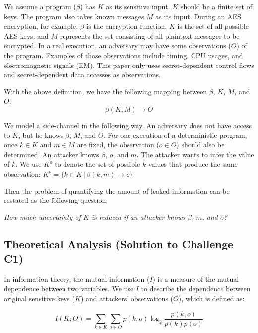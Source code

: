 We assume a program ($\beta$) has $K$ as its sensitive input. $K$ should be 
a finite set of keys. The program also takes known messages $M$ as its input. 
During an AES encryption, for example, 
$\beta$ is the encryption function. $K$ is the set of all possible AES keys, 
and $M$ represents the set consisting of all plaintext messages to be encrypted. In a real execution, an adversary may have 
some observations ($O$) of the program. Examples of those observations include 
timing, CPU usages, and electromagnetic signals (EM). This paper only
uses secret-dependent control flows and secret-dependent data 
accesses as observations.

With the above definition, we have the following mapping between $\beta$,
$K$, $M$, and $O$:
\begin{displaymath}
    \beta(K, M) \rightarrow O
\end{displaymath}


We model a side-channel in the following way. An adversary does not have
access to $K$, but he knows $\beta$, $M$, and $O$. For one execution of a
deterministic program, once $k \in K$ and $m \in M$ are fixed, the observation
($o \in O$) should also be determined. An attacker knows $\beta$, $o$,
and $m$. The attacker wants to infer the value of $k$. We use $K^o$ to denote
the set of possible $k$ values that produce the same observation: $K^o = \{ k \in K \, |\, \beta(k, m) \rightarrow o\}$

Then the problem of quantifying the amount of leaked information can be
restated as the following question:

\emph{How much uncertainty of $K$ is reduced if an attacker knows $\beta$, $m$, and $o$?}

\subsection{Theoretical Analysis \textbf{(Solution to Challenge C1)}}
In information theory, the mutual information ($I$) is a measure of the mutual
dependence between two variables. We use $I$ to describe the
dependence between original sensitive keys ($K$) and attackers' observations ($O$), which is defined as:

\begin{equation} \label{eq:1}
    I(K;O) = \sum_{k {\in} K}{\sum_{o {\in} O}{p(k, o)\log_2\frac{p(k, o)}{p(k)p(o)}}}
\end{equation}

